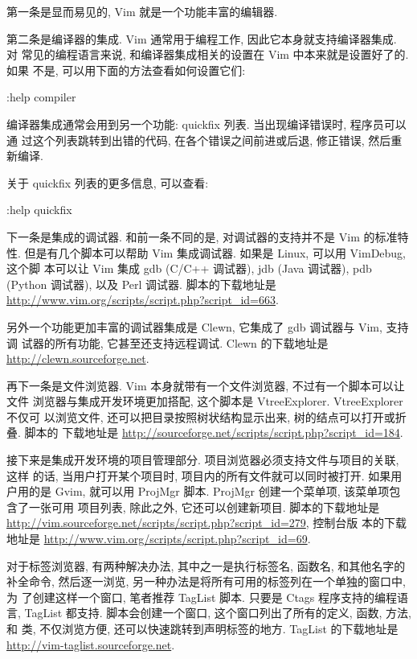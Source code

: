 第一条是显而易见的, Vim 就是一个功能丰富的编辑器.

第二条是编译器的集成. Vim 通常用于编程工作, 因此它本身就支持编译器集成. 对
常见的编程语言来说, 和编译器集成相关的设置在 Vim 中本来就是设置好了的. 如果
不是, 可以用下面的方法查看如何设置它们:
\begin{vimcode}
:help compiler
\end{vimcode}
编译器集成通常会用到另一个功能: quickfix 列表. 当出现编译错误时, 程序员可以通
过这个列表跳转到出错的代码, 在各个错误之间前进或后退, 修正错误, 然后重新编译.

关于 quickfix 列表的更多信息, 可以查看:
\begin{vimcode}
:help quickfix
\end{vimcode}

下一条是集成的调试器. 和前一条不同的是, 对调试器的支持并不是 Vim 的标准特性.
但是有几个脚本可以帮助 Vim 集成调试器. 如果是 Linux, 可以用 VimDebug, 这个脚
本可以让 Vim 集成 gdb (C/C++ 调试器), jdb (Java 调试器), pdb (Python 调试器),
以及 Perl 调试器. 脚本的下载地址是
\url{http://www.vim.org/scripts/script.php?script_id=663}.

另外一个功能更加丰富的调试器集成是 Clewn, 它集成了 gdb 调试器与 Vim, 支持调
试器的所有功能, 它甚至还支持远程调试. Clewn 的下载地址是
\url{http://clewn.sourceforge.net}.

再下一条是文件浏览器. Vim 本身就带有一个文件浏览器, 不过有一个脚本可以让文件
浏览器与集成开发环境更加搭配, 这个脚本是 VtreeExplorer. VtreeExplorer 不仅可
以浏览文件, 还可以把目录按照树状结构显示出来, 树的结点可以打开或折叠. 脚本的
下载地址是 \url{http://sourceforge.net/scripts/script.php?script_id=184}.

接下来是集成开发环境的项目管理部分. 项目浏览器必须支持文件与项目的关联, 这样
的话, 当用户打开某个项目时, 项目内的所有文件就可以同时被打开. 如果用户用的是
Gvim, 就可以用 ProjMgr 脚本. ProjMgr 创建一个菜单项, 该菜单项包含了一张可用
项目列表, 除此之外, 它还可以创建新项目. 脚本的下载地址是
\url{http://vim.sourceforge.net/scripts/script.php?script_id=279}, 控制台版
本的下载地址是 \url{http://www.vim.org/scripts/script.php?script_id=69}.

对于标签浏览器, 有两种解决办法, 其中之一是执行标签名, 函数名, 和其他名字的
补全命令, 然后逐一浏览, 另一种办法是将所有可用的标签列在一个单独的窗口中, 为
了创建这样一个窗口, 笔者推荐 TagList 脚本. 只要是 Ctags 程序支持的编程语言,
TagList 都支持. 脚本会创建一个窗口, 这个窗口列出了所有的定义, 函数, 方法, 和
类, 不仅浏览方便, 还可以快速跳转到声明标签的地方. TagList 的下载地址是
\url{http://vim-taglist.sourceforge.net}.

